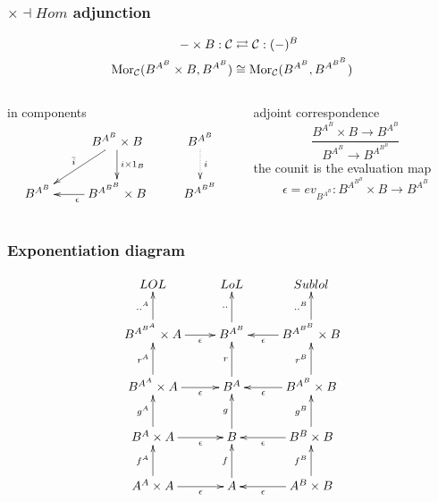 \begin{frame}[t]
\frametitle{$\times \dashv Hom$ adjunction}
\begin{block}{}
\abovedisplayskip=0pt
\begin{align*}
- \times B: \mathcal{C} & \rightleftarrows \mathcal{C}: (-)^B\\
\mathop{\rm Mor}\nolimits_{\mathcal{C}}(B^{A^B} \times B, B^{A^B}) & \cong  \mathop{\rm Mor}\nolimits_{\mathcal{C}}(B^{A^B}, B^{A^{B^B}})
\end{align*}
\end{block}
\begin{columns}[t]
    \begin{column}{0.5\textwidth}
\begin{block}{in components}
			$$
			\xymatrix{
			& B^{A^B} \times B \ar[d]^-{i \times 1_B} \ar[dl]_{\bar{i}} & B^{A^B} \ar@{.>}[d]^-{i}\\
			B^{A^B} & B^{A^{B^B}} \times B \ar[l]^{\epsilon} & B^{A^{B^B}}
			}
			$$
		\end{block}
    \end{column}
    \begin{column}{0.5\textwidth}
		\begin{block}{adjoint correspondence}
		\abovedisplayskip=0pt
		$$
			\frac{B^{A^B} \times B \longrightarrow B^{A^B}}{B^{A^B} \longrightarrow B^{A^{B^B}}}
		$$
		the counit is the evaluation map
		$$
			\epsilon = ev_{B^{A^B}} \colon B^{A^{B^B}} \times B \longrightarrow B^{A^B}
		$$
		\end{block}		
    \end{column}
\end{columns}
\end{frame}


\begin{frame}[t]
\frametitle{Exponentiation diagram}

$$
			\xymatrix{
			 LOL &LoL &Sublol \\
			  B^{A^{B^A}} \times A \ar[r]_-{\epsilon} \ar[u]^-{..^A} & B^{A^B} \ar[u]^-{..} & B^{A^{B^B}} \times B\ar[l]^-{\epsilon}\ar[u]^-{..^B} \\
			 B^{A^A} \times A \ar[r]_-{\epsilon} \ar[u]^-{r^A} & B^A \ar[u]^-{r} & B^{A^B} \times B\ar[l]^-{\epsilon}\ar[u]^-{r^B} \\
			B^A \times A \ar[r]_-{\epsilon} \ar[u]^-{g^A} & B \ar[u]^-{g} & B^B \times B\ar[l]^-{\epsilon}\ar[u]^-{g^B} \\
			A^A \times A \ar[r]_-{\epsilon} \ar[u]^-{f^A} & 
			A\ar[u]^-{f} & A^B\times B\ar[l]^-{\epsilon}\ar[u]^-{f^B} }
			$$

\end{frame}